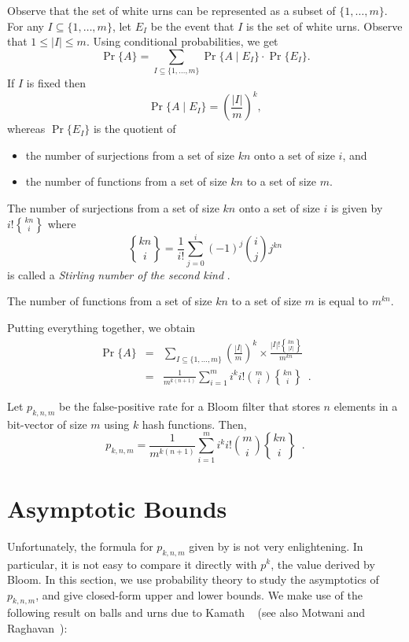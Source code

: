 \documentclass[lotsofwhite]{patmorin}
\newcommand{\stirling}[2]{\genfrac{\{}{\}}{0pt}{}{#1}{#2}}
\begin{document}
Observe that the set of white urns can be represented as a subset of
$\{ 1,\ldots,m \}$.  For any $I \subseteq \{ 1,\ldots,m \}$, let
$E_I$ be the event that $I$ is the set of white urns. Observe that $1
\leq |I| \leq m$. Using conditional probabilities, we get 
\[ \Pr\{A\} = \sum_{I \subseteq \{ 1,\ldots,m \}} 
            \Pr\{ A \mid E_I \} \cdot \Pr\{ E_I \}. 
\] 
If $I$ is fixed then 
\[ \Pr\{ A \mid E_I \} = \left(\frac{|I|}{m}\right)^k ,
\] 
whereas $\Pr\{ E_I \}$ is the quotient of 
\begin{itemize} 
\item the number of surjections from a set of size $kn$ onto a set of
size $i$, and
\item the number of functions from a set of size $kn$ to a set of size
$m$.
\end{itemize} 


The number of surjections from a set of size $kn$ onto a set of size
$i$ is given by $i!\stirling{kn}{i}$ where 
\[ 
 \stirling{kn}{i} = 
     \frac{1}{i!}\sum_{j=0}^i (-1)^j \binom{i}{j} j^{kn} 
\] is called a
\emph{Stirling number of the second kind} \cite[Section~6.1]{gkp94}.
 
The number of functions from a set of size $kn$ to a set of size $m$
is equal to $m^{kn}$. 

Putting everything together, we obtain 
\begin{eqnarray*} 
 \Pr\{ A \} & = & \sum_{I \subseteq \{ 1,\ldots,m \}}
              \left(\frac{|I|}{m}\right)^k \times
              \frac{|I|!\stirling{kn}{|I|}}{m^{kn}} \\
  & = & \frac{1}{m^{k(n+1)}}\sum_{i=1}^{m} 
           i^ki!\binom{m}{i}
          \stirling{kn}{i} \enspace .
\end{eqnarray*} 

\begin{thm}
Let $p_{k,n,m}$ be the false-positive rate for a Bloom filter that stores $n$
elements in a bit-vector of size $m$ using $k$ hash functions.  Then,
\[
  p_{k,n,m} = \frac{1}{m^{k(n+1)}}\sum_{i=1}^{m} 
           i^ki!\binom{m}{i}
          \stirling{kn}{i} \enspace .
\]
\end{thm}



\section{Asymptotic Bounds}

Unfortunately, the formula for $p_{k,n,m}$ given by  is
not very enlightening.  In particular, it is not easy to compare it
directly with $p^k$, the value derived by Bloom.  In this section, we
use probability theory to study the asymptotics of $p_{k,n,m}$, and
give closed-form upper and lower bounds.  We make use of the following
result on balls and urns due to Kamath \etal\ \cite{kmps94} (see also
Motwani and Raghavan~\cite[Theorem~4.18]{mr95}):
\end{document}
